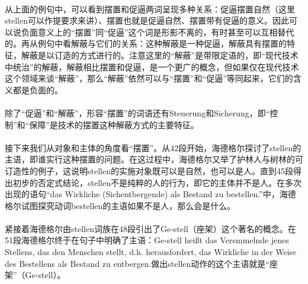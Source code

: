 \documentclass{article}
\begin{document}
			\paragraph{}
			从上面的例句中，可以看到摆置和促逼两词呈现多种关系：促逼摆置自然（这里stellen可以作提要求来讲）、摆置也就是促逼自然、摆置带有促逼的意义。因此可以说负面意义上的“摆置”同“促逼”这个词是形影不离的，有时甚至可以互相替代的。再从例句中看解蔽与它们的关系：这种解蔽是一种促逼，解蔽具有摆置的特征，解蔽是以订造的方式进行的。注意这里的“解蔽”是带限定语的，即“现代技术中统治”的解蔽，解蔽相比摆置和促逼，是一个更广的概念，但如果仅在现代技术这个领域来谈“解蔽”，那么“解蔽”依然可以与“摆置”和“促逼”等同起来，它们的含义都是负面的。
			\paragraph{}
			除了“促逼”和“解蔽”，形容“摆置”的词语还有Steuerung和Sicherung，即“控制”和“保障”是技术的摆置这种解蔽方式的主要特征。


			\paragraph{}
			接下来我们从对象和主体的角度看“摆置”。从42段开始，海德格尔探讨了stellen的主语，即谁实行这种摆置的问题。在这过程中，海德格尔又举了护林人与树林的可订造性的例子，这说明stellen的实施对象既可以是自然，也可以是人。直到45段得出初步的否定式结论，stellen不是纯粹的人的行为，即它的主体并不是人。在多次出现的语句“das Wirkliche (Sichentbergende) als Bestand zu bestellen.”中，海德格尔试图探究动词bestellen的主语如果不是人，那么会是什么。
			\paragraph{}
			紧接着海德格尔由stellen词族在48段引出了Ge-stell（座架）这个著名的概念。在51段海德格尔终于在句子中明确了主语：Ge-stell heißt das Versmmelnde jenes Stellens, das den Menschen stellt, d.h. herausfordert, das Wirkliche in der Weise des Bestellens als Bestand zu entbergen.做出stellen动作的这个主语就是“座架”（Ge-stell）。
			
			
		
		
		
\end{document}
